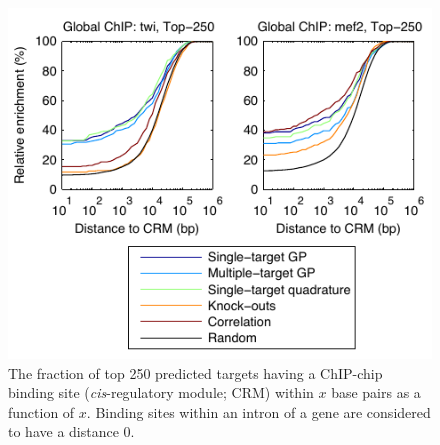 \documentclass{pnastwo}
\begin{document}
\begin{article}
\begin{figure}[tb]
  \centering
  \includegraphics{fig5}
  \caption{The fraction of top 250 predicted targets having a ChIP-chip
    binding site (\emph{cis}-regulatory module; CRM)
    within $x$ base pairs as a function of $x$.
    Binding sites within an intron of a gene are considered to
    have a distance 0.
    \label{fig:dros_binding_site_distances}}
\end{figure}




\end{article}
\end{document}
